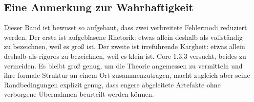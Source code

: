 \subsection{Eine Anmerkung zur Wahrhaftigkeit}

Dieser Band ist bewusst so aufgebaut, dass zwei verbreitete Fehlermodi reduziert werden.
Der erste ist aufgeblasene Rhetorik: etwas allein deshalb als vollständig zu bezeichnen, weil es
groß ist.
Der zweite ist irreführende Kargheit: etwas allein deshalb als rigoros zu bezeichnen, weil es
klein ist.
Core 1.3.3 versucht, beides zu vermeiden.
Es bleibt groß genug, um die Theorie angemessen zu vermitteln und ihre formale Struktur an einem
Ort zusammenzutragen, macht zugleich aber seine Randbedingungen explizit genug, dass engere
abgeleitete Artefakte ohne verborgene Übernahmen beurteilt werden können.

\clearpage
